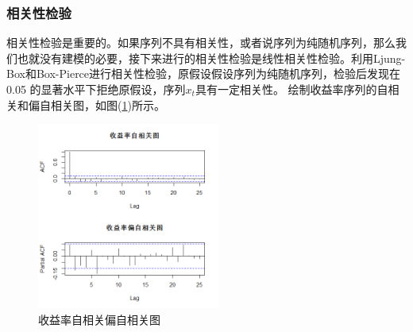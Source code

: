         \subsubsection{相关性检验}
            \par
            相关性检验是重要的。如果序列不具有相关性，或者说序列为纯随机序列，那么我们也就没有建模的必要，接下来进行的相关性检验是线性相关性检验。利用Ljung-Box和Box-Pierce进行相关性检验，原假设假设序列为纯随机序列，检验后发现在0.05 的显著水平下拒绝原假设，序列$x_t$具有一定相关性。
            绘制收益率序列的自相关和偏自相关图，如图(\ref{收益率自相关偏自相关图})所示。
            \begin{figure}[H]
            \centering
            \includegraphics[width = 6cm]{images/rate_of_return_autocorrelation_partial_autocorrelation.jpg}
            \caption{收益率自相关偏自相关图}
            \label{收益率自相关偏自相关图}
            \end{figure}
